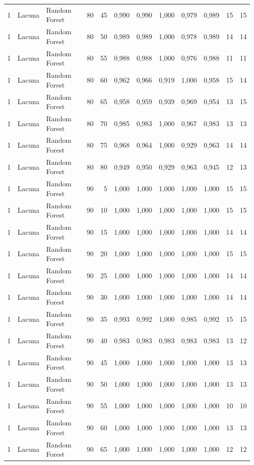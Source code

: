 \begin{longtable}{@{}rllrrrrrrrrr@{}}
1 & Lacuna & Random Forest & 80 & 45 & 0,990 & 0,990 & 1,000 & 0,979 & 0,989 & 15 & 15 \\
1 & Lacuna & Random Forest & 80 & 50 & 0,989 & 0,989 & 1,000 & 0,978 & 0,989 & 14 & 14 \\
1 & Lacuna & Random Forest & 80 & 55 & 0,988 & 0,988 & 1,000 & 0,976 & 0,988 & 11 & 11 \\
1 & Lacuna & Random Forest & 80 & 60 & 0,962 & 0,966 & 0,919 & 1,000 & 0,958 & 15 & 14 \\
1 & Lacuna & Random Forest & 80 & 65 & 0,958 & 0,959 & 0,939 & 0,969 & 0,954 & 13 & 15 \\
1 & Lacuna & Random Forest & 80 & 70 & 0,985 & 0,983 & 1,000 & 0,967 & 0,983 & 13 & 13 \\
1 & Lacuna & Random Forest & 80 & 75 & 0,968 & 0,964 & 1,000 & 0,929 & 0,963 & 14 & 14 \\
1 & Lacuna & Random Forest & 80 & 80 & 0,949 & 0,950 & 0,929 & 0,963 & 0,945 & 12 & 13 \\
1 & Lacuna & Random Forest & 90 & 5 & 1,000 & 1,000 & 1,000 & 1,000 & 1,000 & 15 & 15 \\
1 & Lacuna & Random Forest & 90 & 10 & 1,000 & 1,000 & 1,000 & 1,000 & 1,000 & 15 & 15 \\
1 & Lacuna & Random Forest & 90 & 15 & 1,000 & 1,000 & 1,000 & 1,000 & 1,000 & 14 & 14 \\
1 & Lacuna & Random Forest & 90 & 20 & 1,000 & 1,000 & 1,000 & 1,000 & 1,000 & 15 & 15 \\
1 & Lacuna & Random Forest & 90 & 25 & 1,000 & 1,000 & 1,000 & 1,000 & 1,000 & 14 & 14 \\
1 & Lacuna & Random Forest & 90 & 30 & 1,000 & 1,000 & 1,000 & 1,000 & 1,000 & 14 & 14 \\
1 & Lacuna & Random Forest & 90 & 35 & 0,993 & 0,992 & 1,000 & 0,985 & 0,992 & 15 & 15 \\
1 & Lacuna & Random Forest & 90 & 40 & 0,983 & 0,983 & 0,983 & 0,983 & 0,983 & 13 & 12 \\
1 & Lacuna & Random Forest & 90 & 45 & 1,000 & 1,000 & 1,000 & 1,000 & 1,000 & 13 & 13 \\
1 & Lacuna & Random Forest & 90 & 50 & 1,000 & 1,000 & 1,000 & 1,000 & 1,000 & 13 & 13 \\
1 & Lacuna & Random Forest & 90 & 55 & 1,000 & 1,000 & 1,000 & 1,000 & 1,000 & 10 & 10 \\
1 & Lacuna & Random Forest & 90 & 60 & 1,000 & 1,000 & 1,000 & 1,000 & 1,000 & 13 & 13 \\
1 & Lacuna & Random Forest & 90 & 65 & 1,000 & 1,000 & 1,000 & 1,000 & 1,000 & 12 & 12 \\

\end{longtable}

